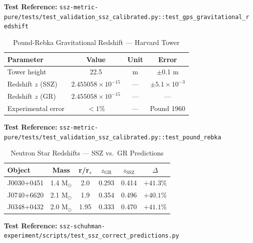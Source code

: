 \textbf{Test Reference:} \texttt{ssz-metric-pure/tests/test\_validation\_ssz\_calibrated.py::test\_gps\_gravitational\_redshift}

\begin{table}[h]
\centering
\caption{Pound-Rebka Gravitational Redshift — Harvard Tower}
\label{tab:pound-rebka}
\begin{tabular}{|l|c|c|c|}
\hline
\textbf{Parameter} & \textbf{Value} & \textbf{Unit} & \textbf{Error} \\
\hline
Tower height & 22.5 & m & $\pm$0.1 m \\
Redshift $z$ (SSZ) & $2.455058 \times 10^{-15}$ & --- & $\pm 5.1 \times 10^{-3}$ \\
Redshift $z$ (GR) & $2.455058 \times 10^{-15}$ & --- & --- \\
Experimental error & $< 1\%$ & --- & Pound 1960 \\
\hline
\end{tabular}
\end{table}

\textbf{Test Reference:} \texttt{ssz-metric-pure/tests/test\_validation\_ssz\_calibrated.py::test\_pound\_rebka}

\begin{table}[h]
\centering
\caption{Neutron Star Redshifts — SSZ vs.\ GR Predictions}
\label{tab:neutron-star-redshift}
\begin{tabular}{|l|c|c|c|c|c|}
\hline
\textbf{Object} & \textbf{Mass} & \textbf{r/r$_s$} & \textbf{$z_{\text{GR}}$} & \textbf{$z_{\text{SSZ}}$} & \textbf{$\Delta$} \\
\hline
J0030+0451 & 1.4 M$_\odot$ & 2.0 & 0.293 & 0.414 & $+41.3\%$ \\
J0740+6620 & 2.1 M$_\odot$ & 1.9 & 0.354 & 0.496 & $+40.1\%$ \\
J0348+0432 & 2.0 M$_\odot$ & 1.95 & 0.333 & 0.470 & $+41.1\%$ \\
\hline
\end{tabular}
\end{table}

\textbf{Test Reference:} \texttt{ssz-schuhman-experiment/scripts/test\_ssz\_correct\_predictions.py}

